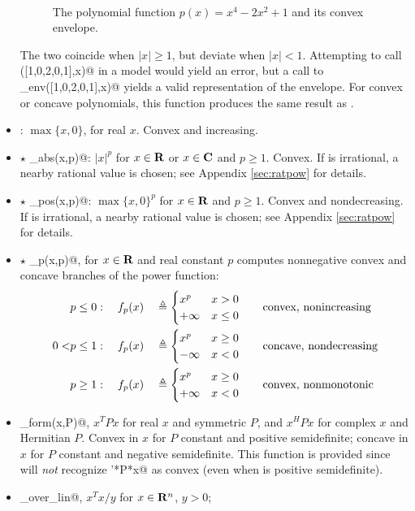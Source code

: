 \documentclass[12pt]{article}
\begin{document}
\begin{itemize}
\begin{figure}
\begin{center}
\end{center}
~\\[-48pt]
\caption{The polynomial function $p(x)=x^4-2x^2+1$ and its convex envelope.}
\label{fig:envelope}
\end{figure}
The two coincide when $|x|\geq 1$, but deviate when $|x|<1$. Attempting to call
\verb@polyval([1,0,2,0,1],x)@ in a \cvx model would  yield an error,
but a call to \verb@poly_env([1,0,2,0,1],x)@ yields a valid 
representation of the envelope. For convex or concave polynomials,
this function produces the same result as \verb@polyval@.
\item \verb@pos@: $\max\{x,0\}$, for real $x$. 
Convex and increasing.
\item $\star$ \verb@pow_abs(x,p)@: $|x|^p$ for $x\in\R$ or $x\in\C$ and $p\geq 1$. Convex.
If \verb@p@ is irrational, a nearby rational value is chosen;
see Appendix \ref{sec:ratpow} for details.
\item $\star$ \verb@pow_pos(x,p)@: $\max\{x,0\}^p$ for $x\in\R$ and $p\geq 1$. Convex and
nondecreasing. If \verb@p@ is irrational, a nearby rational value is chosen;
see Appendix \ref{sec:ratpow} for details.
\item $\star$ \verb@pow_p(x,p)@, for $x\in\R$ and real constant $p$
computes nonnegative convex and concave branches of the power function:
\begin{equation*}
	\begin{aligned}
	&p \leq 0: \quad  
	f_p(x) &&\triangleq \begin{cases}  x^p & x > 0 \\ +\infty & x \leq 0  \end{cases} 
	&& \quad \text{convex, nonincreasing} \\
	0 <  &p \leq 1: \quad
	f_p(x) &&\triangleq\begin{cases}  x^p & x \geq 0 \\ -\infty & x < 0  \end{cases} 
	&& \quad  \text{concave, nondecreasing} \\
	&p \geq 1: \quad
	f_p(x) && \triangleq\begin{cases}  x^p & x \geq 0 \\ +\infty & x < 0  \end{cases}
	&& \quad \text{convex, nonmonotonic}
	\end{aligned}
\end{equation*}
\item \verb@quad_form(x,P)@, $x^TPx$ for real $x$ and symmetric $P$,
and $x^HPx$ for complex $x$ and Hermitian $P$.
Convex in $x$ for $P$ constant and positive semidefinite;
concave in $x$ for $P$ constant and negative semidefinite.
This function is provided since \cvx will \emph{not}
recognize \verb@x'*P*x@ as convex (even when \verb@P@ is 
positive semidefinite).
\item \verb@quad_over_lin@, $x^Tx/y$ for $x \in \R^n$, $y >0$;

\end{itemize}
\end{document}
